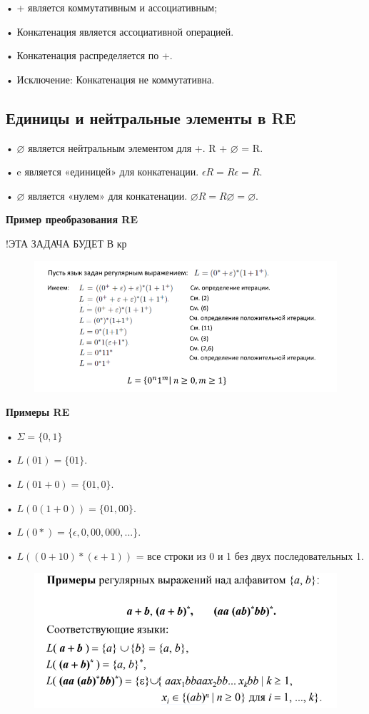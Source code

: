 \documentclass{article}
\begin{document}
• + является коммутативным и ассоциативным;

• Конкатенация является ассоциативной операцией.

• Конкатенация распределяется по +.

• Исключение: Конкатенация не коммутативна.

\subsection{Единицы и нейтральные элементы в RE}

• $\varnothing$ является нейтральным элементом для +.
R + $\varnothing$ = R.

• e является «единицей» для конкатенации.
$\epsilon R = R\epsilon = R.$

• $\varnothing $ является «нулем» для конкатенации.
$\varnothing R = R \varnothing = \varnothing.$

\textbf{Пример преобразования RE}

!ЭТА ЗАДАЧА БУДЕТ В кр

\begin{figure}[H]
    \centering
    \includegraphics[width=1\linewidth]{Снимок экрана 2025-02-27 090738.png}
\end{figure}


\textbf{Примеры RE}


• $\Sigma=\{0,1\}$

• $ L(01) = \{01\}.$

• $L(01+0) = \{01, 0\}.$

• $L(0(1+0)) = \{01, 00\}.$

• $ L(0*) = \{\epsilon, 0, 00, 000,... \}.$

• $ L((0+10)*(\epsilon+1))$ = все строки из 0 и 1 без двух последовательных 1.
 

\begin{figure}[H]
    \centering
    \includegraphics[width=1\linewidth]{Снимок экрана 2025-02-27 091410.png}
\end{figure}
\end{document}
